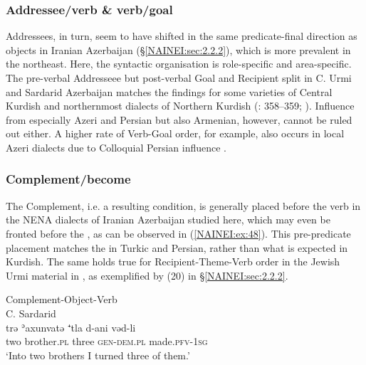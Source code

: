 \documentclass[output=paper,colorlinks,citecolor=brown,draftmode]{langscibook}
\begin{document}
\subsubsection{Addressee/verb \& verb/goal}\label{NAINEI:sec:3.2.3}
Addressees, in turn, seem to have shifted in the same predicate-final direction as objects in Iranian Azerbaijan (§\ref{NAINEI:sec:2.2.2}), which is more prevalent in the northeast. Here, the syntactic organisation is role-specific and area-specific. The pre-verbal Addresseee but post-verbal Goal and Recipient split in C. Urmi and Sardarid Azerbaijan matches the findings for some varieties of Central Kurdish and northernmost dialects of Northern Kurdish (\citealt{Haig2022PostPredicateCon}: 358–359; ). Influence from especially Azeri and Persian but also Armenian, however, cannot be ruled out either. A higher rate of Verb-Goal order, for example, also occurs in local Azeri dialects due to Colloquial Persian influence \parencite[75--77]{Kiral2001Persian}.

\subsubsection{Complement/become}
The Complement, i.e. a resulting condition, is generally placed before the verb in the NENA dialects of Iranian Azerbaijan studied here, which may even be fronted before the , as can be observed in (\ref{NAINEI:ex:48}). This pre-predicate placement matches the  in Turkic and Persian, rather than what is expected in Kurdish. The same holds true for Recipient-Theme-Verb order in the Jewish Urmi material in \citet{Khan2008Barwar}, as exemplified by (20) in §\ref{NAINEI:sec:2.2.2}.

\newpage
\ea\label{NAINEI:ex:48}
Complement-Object-Verb\\
C. Sardarid \citep[15:\S 1]{Younansardaroud2001Sardarid} \\
\gll trə ʾaxunvatə ⁺tla d-ani vəd-li \\
     two brother\textsc{.pl} three \textsc{gen-dem.pl} made\textsc{.pfv-1sg} \\
\glt `Into two brothers I turned three of them.'
\z
\end{document}
